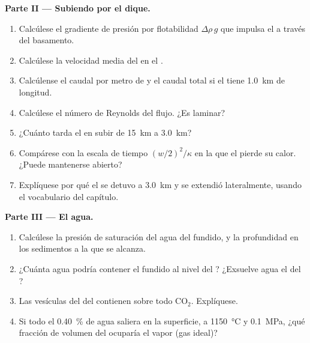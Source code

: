 \begin{problem}
\noindent\textbf{Parte II --- Subiendo por el dique.}
\begin{enumerate}[resume]
\item Calcúlese el gradiente de presión por flotabilidad $\Delta\rho\,g$ que impulsa el 
a través del basamento.
\item Calcúlese la velocidad media del  en el .
\item Calcúlense el caudal por metro de  y el caudal total si el  tiene
\qty{1.0}{km} de longitud.
\item Calcúlese el número de Reynolds del flujo. ¿Es laminar?
\item ¿Cuánto tarda el  en subir de \qty{15}{km} a \qty{3.0}{km}?
\item Compárese con la escala de tiempo $(w/2)^2/\kappa$ en la que el  pierde su
calor. ¿Puede mantenerse abierto?
\item Explíquese por qué el  se detuvo a \qty{3.0}{km} y se extendió lateralmente, usando
el vocabulario del capítulo.
\end{enumerate}

\noindent\textbf{Parte III --- El agua.}
\begin{enumerate}[resume]
\item Calcúlese la presión de saturación del agua del fundido, y la profundidad en los
sedimentos a la que se alcanza.
\item ¿Cuánta agua podría contener el fundido al nivel del ? ¿Exsuelve agua el 
del ?
\item Las vesículas del  del  contienen sobre todo CO$_2$. Explíquese.
\item Si todo el \qty{0.40}{\percent} de agua saliera en la superficie, a
\qty{1150}{\celsius} y \qty{0.1}{MPa}, ¿qué fracción de volumen del  ocuparía
el vapor (gas ideal)?
\end{enumerate}


\end{problem}

